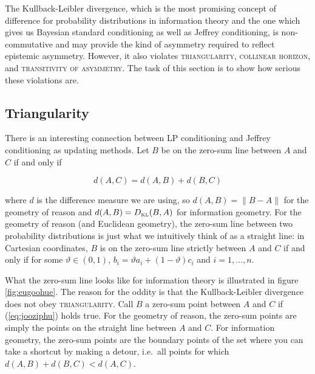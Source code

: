 \documentclass[smallextended]{svjour3}       %
\begin{document}
The Kullback-Leibler divergence, which is the most promising concept
of difference for probability distributions in information theory and
the one which gives us Bayesian standard conditioning as well as
Jeffrey conditioning, is non-commutative and may provide the kind of
asymmetry required to reflect epistemic asymmetry. However, it also
violates \textsc{triangularity}, \textsc{collinear horizon}, and
\textsc{transitivity of asymmetry}. The task of this section is to
show how serious these violations are.

\subsection{Triangularity}
\label{subsec:triangularity}

There is an interesting connection between LP conditioning and Jeffrey
conditioning as updating methods. Let $B$ be on the zero-sum line
between $A$ and $C$ if and only if

\begin{equation}
\label{eq:jooziphu}
d(A,C)=d(A,B)+d(B,C)
\end{equation}

where $d$ is the difference measure we are using, so $d(A,B)=\|B-A\|$
for the geometry of reason and $d(A,B)=D_{\mbox{\tiny KL}}(B,A)$ for
information geometry. For the geometry of reason (and Euclidean
geometry), the zero-sum line between two probability distributions is
just what we intuitively think of as a straight line: in Cartesian
coordinates, $B$ is on the zero-sum line strictly between $A$ and $C$
if and only if for some $\vartheta\in(0,1)$,
$b_{i}=\vartheta{}a_{i}+(1-\vartheta)c_{i}$ and $i=1,\ldots,n$.

What the zero-sum line looks like for information theory is
illustrated in figure \ref{fig:eugoohue}. The reason for the oddity is
that the Kullback-Leibler divergence does not obey
\textsc{triangularity}. Call $B$ a zero-sum point between $A$ and $C$
if (\ref{eq:jooziphu}) holds true. For the geometry of reason, the
zero-sum points are simply the points on the straight line between $A$
and $C$. For information geometry, the zero-sum points are the
boundary points of the set where you can take a shortcut by making a
detour, i.e.\ all points for which $d(A,B)+d(B,C)<d(A,C)$.
\end{document}

